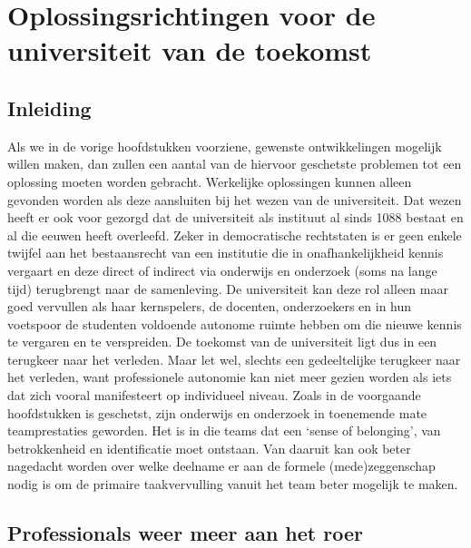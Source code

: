 \documentclass{jote-book}
\begin{document}
	\section{Oplossingsrichtingen voor de universiteit van de toekomst}



	\subsection{Inleiding}



	Als we in de vorige hoofdstukken voorziene, gewenste ontwikkelingen mogelijk willen maken, dan zullen een aantal van de hiervoor geschetste problemen tot een oplossing moeten worden gebracht. Werkelijke oplossingen kunnen alleen gevonden worden als deze aansluiten bij het wezen van de universiteit. Dat wezen heeft er ook voor gezorgd dat de universiteit als instituut al sinds 1088 bestaat en al die eeuwen heeft overleefd. Zeker in democratische rechtstaten is er geen enkele twijfel aan het bestaansrecht van een institutie die in onafhankelijkheid kennis vergaart en deze direct of indirect via onderwijs en onderzoek (soms na lange tijd) terugbrengt naar de samenleving. De universiteit kan deze rol alleen maar goed vervullen als haar kernspelers, de docenten, onderzoekers en in hun voetspoor de studenten voldoende autonome ruimte hebben om die nieuwe kennis te vergaren en te verspreiden. De toekomst van de universiteit ligt dus in een terugkeer naar het verleden. Maar let wel, slechts een gedeeltelijke terugkeer naar het verleden, want professionele autonomie kan niet meer gezien worden als iets dat zich vooral manifesteert op individueel niveau. Zoals in de voorgaande hoofdstukken is geschetst, zijn onderwijs en onderzoek in toenemende mate teamprestaties geworden. Het is in die teams dat een ‘sense of belonging', van betrokkenheid en identificatie moet ontstaan. Van daaruit kan ook beter nagedacht worden over welke deelname er aan de formele (mede)zeggenschap nodig is om de primaire taakvervulling vanuit het team beter mogelijk te maken.



	\subsection{Professionals weer meer aan het roer}
\end{document}
